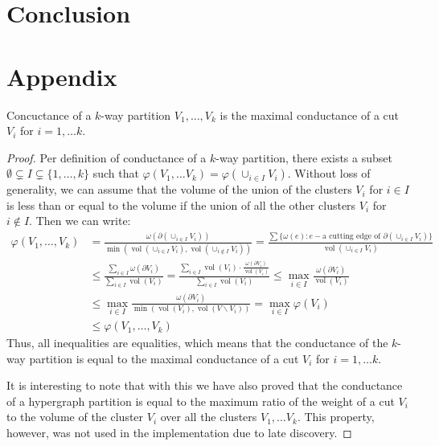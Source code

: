 \documentclass[acmsmall,nonacm,screen,review]{acmart}
\DeclareMathOperator{\vol}{vol}
\begin{document}
\section{Conclusion}
\label{sec:conclusion}

\appendix
\section{Appendix}
\label{appendix:a}

\begin{theorem}
  Concuctance of a $k$-way partition $V_1, \dots, V_k$ is the maximal conductance 
  of a cut $V_i$ for $i = 1, \dots k$. 
\end{theorem}
\begin{proof}
Per definition of conductance of a $k$-way partition, there exists a subset 
$\emptyset \subsetneq I \subsetneq \{1, \dots, k\}$ such that 
$\varphi(V_1, \dots V_k) = \varphi(\cup_{i \in I} V_i)$. Without loss of
generality, we can assume that the volume of the union of the clusters
$V_i$ for $i \in I$ is less than or equal to the volume if the union of all the
other clusters $V_i$ for $i \notin I$. Then we can write:
\begin{align*}
\varphi(V_1, \dots, V_k) 
&= 
\frac{\omega(\partial (\cup_{i \in I} V_i))}
     {\min(\vol(\cup_{i \in I} V_i), \vol(\cup_{i \notin I} V_i))} 
=
\frac{\sum \{\omega(e) : e - \text{a cutting edge of } \partial(\cup_{i \in I} V_i)\}}
     {\vol(\cup_{i \in I} V_i)}
\\ & \leq
\frac{\sum_{i \in I} \omega(\partial V_i)}
     {\sum_{i \in I} \vol(V_i)} 
=
\frac{\sum_{i \in I} \vol(V_i) \cdot \frac{\omega(\partial V_i)}
                                          {\vol(V_i)}}
     {\sum_{i \in I} \vol(V_i)} 
\leq
\max_{i \in I}\frac{\omega(\partial V_i)}
                   {\vol(V_i)}
\\ &\leq
\max_{i \in I}\frac{\omega(\partial V_i)}
                   {\min(\vol(V_i), \vol(V \backslash V_i))}
=
\max_{i \in I} \varphi(V_i)
\\ &\leq 
\varphi(V_1, \dots, V_k)
\end{align*}
Thus, all inequalities are equalities, which means that the conductance of the
$k$-way partition is equal to the maximal conductance of a cut $V_i$ for
$i = 1, \dots k$.

It is interesting to note that with this we have also proved that the 
conductance of a hypergraph partition is equal to the maximum ratio of the 
weight of a cut $V_i$ to the volume of the cluster $V_i$ over all the clusters 
$V_1, \dots V_k$. This property, however, was not used in the implementation 
due to late discovery.
\end{proof}
\end{document}
